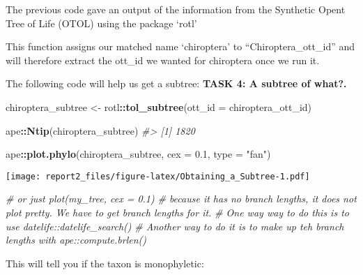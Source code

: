 \documentclass[]{article}
\newenvironment{Shaded}{\begin{snugshade}}{\end{snugshade}}
\newcommand{\CommentTok}[1]{\textcolor[rgb]{0.56,0.35,0.01}{\textit{#1}}}
\newcommand{\DataTypeTok}[1]{\textcolor[rgb]{0.13,0.29,0.53}{#1}}
\newcommand{\FloatTok}[1]{\textcolor[rgb]{0.00,0.00,0.81}{#1}}
\newcommand{\KeywordTok}[1]{\textcolor[rgb]{0.13,0.29,0.53}{\textbf{#1}}}
\newcommand{\NormalTok}[1]{#1}
\newcommand{\OperatorTok}[1]{\textcolor[rgb]{0.81,0.36,0.00}{\textbf{#1}}}
\newcommand{\StringTok}[1]{\textcolor[rgb]{0.31,0.60,0.02}{#1}}
\begin{document}
The previous code gave an output of the information from the Synthetic
Opent Tree of Life (OTOL) using the package `rotl'

This function assigns our matched name `chiroptera' to
``Chiroptera\_ott\_id'' and will therefore extract the ott\_id we wanted
for chiroptera once we run it.

\begin{Shaded}
\end{Shaded}

The following code will help us get a subtree: \textbf{TASK 4: A subtree
of what?.}

\begin{Shaded}
\begin{Highlighting}[]
\NormalTok{chiroptera_subtree <-}\StringTok{ }\NormalTok{rotl}\OperatorTok{::}\KeywordTok{tol_subtree}\NormalTok{(}\DataTypeTok{ott_id =}\NormalTok{ chiroptera_ott_id)}

\NormalTok{ape}\OperatorTok{::}\KeywordTok{Ntip}\NormalTok{(chiroptera_subtree)}
\CommentTok{#> [1] 1820}

\NormalTok{ape}\OperatorTok{::}\KeywordTok{plot.phylo}\NormalTok{(chiroptera_subtree, }\DataTypeTok{cex =} \FloatTok{0.1}\NormalTok{, }\DataTypeTok{type =} \StringTok{"fan"}\NormalTok{)}
\end{Highlighting}
\end{Shaded}

\texttt{[image: report2\_files/figure-latex/Obtaining\_a\_Subtree-1.pdf]}

\begin{Shaded}
\begin{Highlighting}[]
\CommentTok{# or just plot(my_tree, cex = 0.1)}
\CommentTok{# because it has no branch lengths, it does not plot pretty. We have to get branch lengths for it.}
\CommentTok{# One way way to do this is to use datelife::datelife_search()}
\CommentTok{# Another way to do it is to make up teh branch lengths with ape::compute.brlen()}
\end{Highlighting}
\end{Shaded}

This will tell you if the taxon is monophyletic:
\end{document}
